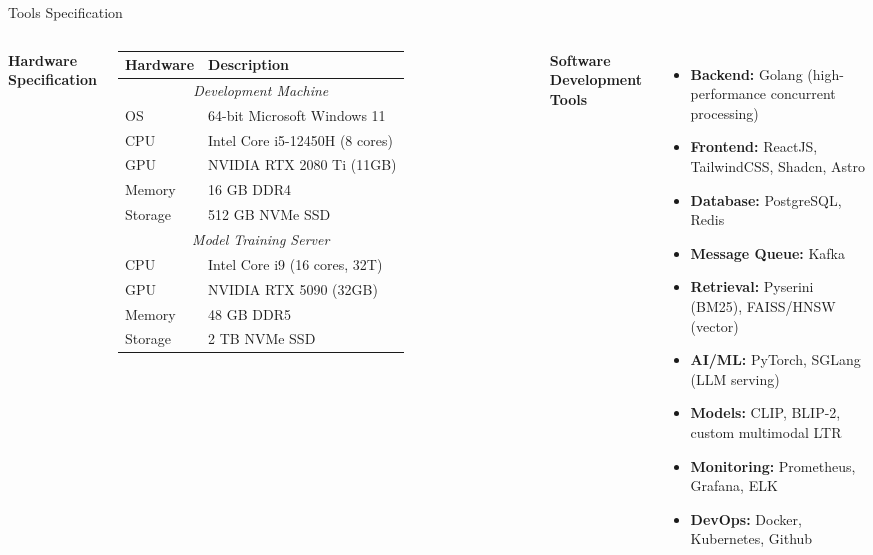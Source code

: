 \documentclass[aspectratio=169,xcolor=dvipsnames]{beamer}
\begin{document}
\begin{frame}{Tools Specification}
  \begin{columns}[t]
    \textbf{Hardware Specification}
    \small
    \begin{table}
      \centering\renewcommand{\arraystretch}{1.1}
      \begin{tabular}{p{.30\linewidth}|p{.60\linewidth}}
        \toprule
        \textbf{Hardware} & \textbf{Description}\\
        \midrule
        \multicolumn{2}{c}{\textit{Development Machine}}\\
        OS      & 64-bit Microsoft Windows 11\\
        CPU     & Intel Core i5-12450H (8 cores)\\
        GPU     & NVIDIA RTX 2080 Ti (11GB)\\
        Memory  & 16 GB DDR4\\
        Storage & 512 GB NVMe SSD\\
        \midrule
        \multicolumn{2}{c}{\textit{Model Training Server}}\\
        CPU     & Intel Core i9 (16 cores, 32T)\\
        GPU     & NVIDIA RTX 5090 (32GB)\\
        Memory  & 48 GB DDR5\\
        Storage & 2 TB NVMe SSD\\
        \bottomrule
      \end{tabular}
    \end{table}
    \textbf{Software Development Tools}
    \begin{itemize}\small
      \item \textbf{Backend:} Golang (high-performance concurrent processing)
      \item \textbf{Frontend:} ReactJS, TailwindCSS, Shadcn, Astro
      \item \textbf{Database:} PostgreSQL, Redis
      \item \textbf{Message Queue:} Kafka
      \item \textbf{Retrieval:} Pyserini (BM25), FAISS/HNSW (vector)
      \item \textbf{AI/ML:} PyTorch, SGLang (LLM serving)
      \item \textbf{Models:} CLIP, BLIP-2, custom multimodal LTR
      \item \textbf{Monitoring:} Prometheus, Grafana, ELK
      \item \textbf{DevOps:} Docker, Kubernetes, Github
    \end{itemize}
  \end{columns}
\end{frame}
\end{document}
